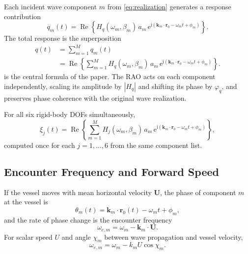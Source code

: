 \documentclass[journal,10pt,twocolumn]{IEEEtran}
\newcommand{\ii}{\mathrm{i}}
\newcommand{\ee}{\mathrm{e}}
\newcommand{\Real}{\operatorname{Re}}
\newcommand{\vect}[1]{\bm{#1}}
\begin{document}
    Each incident wave component $m$ from \eqref{eq:realization} generates a response
    contribution
    \begin{equation}
        q_m(t)
        = \Real\!\left\{
        H_q(\omega_m,\beta_m)\,a_m\,
        \ee^{\ii(\vect{k}_m\cdot\vect{r}_0 - \omega_m t + \phi_m)}
        \right\}.
        \label{eq:component_response}
    \end{equation}
    The total response is the superposition
	\begin{equation}
	\begin{aligned}
	q(t)
	&= \sum_{m=1}^{M} q_m(t) \\
	&= \Real\!\left\{
	   \sum_{m=1}^{M}
	   H_q(\omega_m,\beta_m)\,a_m\,
	   \ee^{\ii(\vect{k}_m\cdot\vect{r}_0 - \omega_m t + \phi_m)}
	   \right\}.
	\end{aligned}
	\label{eq:response_sum}
	\end{equation}
     is the central formula of the paper.
    The RAO acts on each component independently, scaling its amplitude by $|H_q|$ and
    shifting its phase by $\varphi_q$, and preserves phase coherence with the original wave
    realization.

    For all six rigid-body DOFs simultaneously,
    \begin{equation}
        \xi_j(t)
        = \Real\!\left\{
        \sum_{m=1}^{M}
        H_j(\omega_m,\beta_m)\,a_m\,
        \ee^{\ii(\vect{k}_m\cdot\vect{r}_0 - \omega_m t + \phi_m)}
        \right\},
        \label{eq:motion_dof}
    \end{equation}
    computed once for each $j=1,\ldots,6$ from the same component list.

    \subsection{Encounter Frequency and Forward Speed}
    \label{sec:encounter}

    If the vessel moves with mean horizontal velocity $\vect{U}$, the phase of component
    $m$ at the vessel is
    \begin{equation}
        \theta_m(t) = \vect{k}_m\cdot\vect{r}_0(t) - \omega_m t + \phi_m,
    \end{equation}
    and the rate of phase change is the encounter frequency
    \begin{equation}
        \omega_{e,m} = \omega_m - \vect{k}_m\cdot\vect{U}.
        \label{eq:encounter}
    \end{equation}
    For scalar speed $U$ and angle $\chi_m$ between wave propagation and vessel velocity,
    \begin{equation}
        \omega_{e,m} = \omega_m - k_m U\cos\chi_m.
        \label{eq:encounter_scalar}
    \end{equation}
\end{document}
